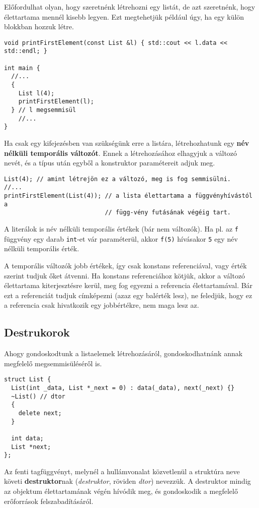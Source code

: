 \documentclass[../cpp_book/cpp_book.tex]{subfiles}
\begin{document}
	\medskip
	Előfordulhat olyan, hogy szeretnénk létrehozni egy listát, de azt szeretnénk, hogy élettartama mennél kisebb legyen. Ezt megtehetjük például úgy, ha egy külön blokkban hozzuk létre.
	\begin{lstlisting}
void printFirstElement(const List &l) { std::cout << l.data << std::endl; }

int main {
  //...
  {
    List l(4);
    printFirstElement(l);
  } // l megsemmisül
    //...
}
	\end{lstlisting}
	Ha csak egy kifejezésben van szükségünk erre a listára, létrehozhatunk egy \textbf{név nélküli temporális változót}. Ennek a létrehozásához elhagyjuk a változó nevét, és a típus után egyből a konstruktor paramétereit adjuk meg.
	\begin{lstlisting}
List(4); // amint létrejön ez a változó, meg is fog semmisülni.
//...
printFirstElement(List(4)); // a lista élettartama a függvényhívástól a
                            // függ-vény futásának végéig tart.
	\end{lstlisting}
	\begin{note}
    A literálok is név nélküli temporális értékek (bár nem változók). Ha pl. az \texttt{f} függvény egy darab \texttt{int}-et vár paraméterül, akkor \texttt{f(5)} hívásakor \texttt{5} egy név nélküli temporális érték.
	\end{note}
	\begin{note}
		A temporális változók jobb értékek, így csak konstans referenciával, vagy érték szerint tudjuk őket átvenni. Ha konstans referenciához kötjük, akkor a változó élettartama kiterjesztésre kerül, meg fog egyezni a referencia élettartamával. Bár ezt a referenciát tudjuk címképezni (azaz egy balérték lesz), ne feledjük, hogy ez a referencia csak hivatkozik egy jobbértékre, nem maga lesz az.
	\end{note}
	\subsection{Destrukorok}
	Ahogy gondoskodtunk a listaelemek létrehozásáról, gondoskodhatnánk annak megfelelő megsemmisüléséről is.
	\begin{lstlisting}
struct List {
  List(int _data, List *_next = 0) : data(_data), next(_next) {}
  ~List() // dtor
  {
    delete next;
  }

  int data;
  List *next;
};
	\end{lstlisting}
	Az fenti tagfüggvényt, melynél a hullámvonalat közvetlenül a struktúra neve követi \textbf{destruktor}nak (\textit{destruktor}, röviden \textit{dtor}) nevezzük. A destruktor mindig az objektum élettartamának végén hívódik meg, és gondoskodik a megfelelő erőforrások felszabadításáról. 
	
\end{document}
